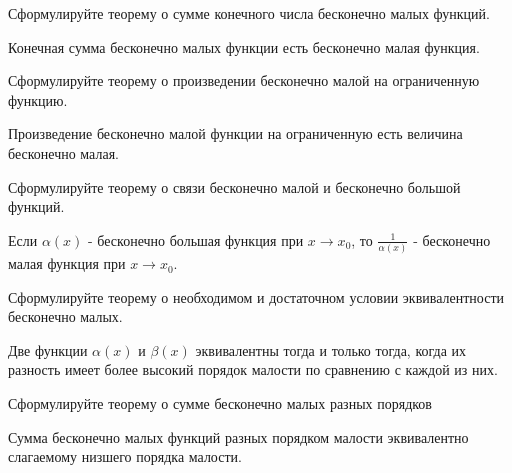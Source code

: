 \begin{question}
  Сформулируйте теорему о сумме конечного числа бесконечно малых функций.
\end{question}
\begin{answer}
  Конечная сумма бесконечно малых функции есть бесконечно малая функция.
\end{answer}

\begin{question}
  Сформулируйте теорему о произведении бесконечно малой на ограниченную функцию.
\end{question}
\begin{answer}
  Произведение бесконечно малой функции на ограниченную есть величина бесконечно малая.  
\end{answer}

\begin{question}
  Сформулируйте теорему о связи бесконечно малой и бесконечно большой функций.
\end{question}
\begin{answer}
  Если $\alpha(x)$ - бесконечно большая функция при $x \to x_0$, то $\frac{1}{\alpha(x)}$ - бесконечно малая функция при $x \to x_0$.  
\end{answer}

\begin{question}
  Сформулируйте теорему о необходимом и достаточном условии эквивалентности бесконечно малых.
\end{question}
\begin{answer}
  Две функции $\alpha(x)$ и $\beta(x)$ эквивалентны тогда и только тогда, когда их разность имеет более высокий порядок малости по сравнению с каждой из них.
\end{answer}

\begin{question}
  Сформулируйте теорему о сумме бесконечно малых разных порядков
\end{question}
\begin{answer}
  Сумма бесконечно малых функций разных порядком малости эквивалентно слагаемому низшего порядка малости.
\end{answer}


